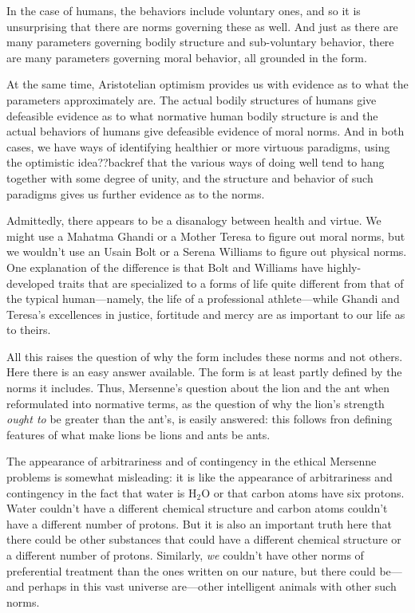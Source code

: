 In the case of humans, the behaviors include voluntary ones, and so it is unsurprising that there are norms governing these
as well. And just as there are many parameters governing bodily structure and sub-voluntary behavior, there are many parameters
governing moral behavior, all grounded in the form. 

At the same time, Aristotelian optimism provides us with evidence as to what the parameters approximately are. The actual
bodily structures of humans give defeasible evidence as to what normative human bodily structure is and the actual behaviors
of humans give defeasible evidence of moral norms. And in both cases, we have ways of identifying healthier or more virtuous 
paradigms, using the optimistic idea??backref that the various ways of doing well tend to hang together with some
degree of unity, and the structure and behavior of such paradigms gives us further evidence as to the norms.

Admittedly, there appears to be a disanalogy between health and virtue. We might use a Mahatma Ghandi or a Mother Teresa to 
figure out moral norms, but we wouldn't use an Usain Bolt or a Serena Williams to figure out physical norms. One explanation 
of the difference is that Bolt and Williams have highly-developed traits that are specialized to a forms of life quite
different from that of the typical human---namely, the life of a professional athlete---while Ghandi and Teresa's excellences
in justice, fortitude and mercy are as important to our life as to theirs.

All this raises the question of why the form includes these norms and not others. Here there is an easy 
answer available. The form is at least partly defined by the norms it includes. Thus, Mersenne's question about the lion and
the ant when reformulated into normative terms, as the question of why the lion's strength \textit{ought to} be greater
than the ant's, is easily answered: this follows fron defining features of what make lions be lions and ants be ants. 

The appearance of arbitrariness and of contingency in the ethical Mersenne problems is somewhat misleading: it is like the appearance of arbitrariness and
contingency in the fact that water is H$_2$O or that carbon atoms have six protons. Water couldn't have a different chemical
structure and carbon atoms couldn't have a different number of protons. But it is also an important truth  here that there 
could be other substances that could have a different chemical structure or a different number of protons. Similarly, \textit{we}
couldn't have other norms of preferential treatment than the ones written on our nature, but there could be---and perhaps in
this vast universe are---other intelligent animals with other such norms.

